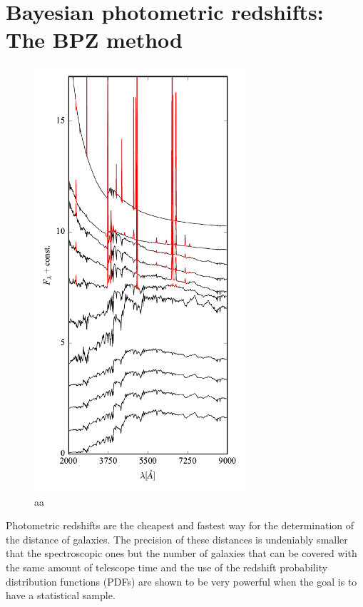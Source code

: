 \documentclass[9pt]{memoir}
\begin{document}
\section{Bayesian photometric redshifts: The BPZ method}
\label{sec:bpz}

\begin{figure}
\begin{adjustwidth*}{1in}{0pt}
\centering
\includegraphics[width=0.7\textwidth]{figures/bpz_templates.pdf}
\end{adjustwidth*}
\caption{aa}
\label{fig:bpz_templates}
\end{figure}


Photometric redshifts are the cheapest and fastest way for the determination of the distance of galaxies. The precision of these distances is undeniably smaller that the spectroscopic ones but the number of galaxies that can be covered with the same amount of telescope time and the use of the redshift probability distribution functions (PDFs) are shown to be very powerful when the goal is to have a statistical sample.
\end{document}
